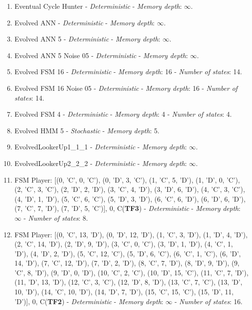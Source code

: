 \documentclass[10pt,letterpaper]{article}
\begin{document}
\begin{enumerate}
\item Eventual Cycle Hunter - \textit{Deterministic} - \textit{Memory depth}: \(\infty\). \cite{axelrodproject}
\item Evolved ANN - \textit{Deterministic} - \textit{Memory depth}: \(\infty\). \cite{axelrodproject}
\item Evolved ANN 5 - \textit{Deterministic} - \textit{Memory depth}: \(\infty\). \cite{axelrodproject}
\item Evolved ANN 5 Noise 05 - \textit{Deterministic} - \textit{Memory depth}: \(\infty\). \cite{axelrodproject}
\item Evolved FSM 16 - \textit{Deterministic} - \textit{Memory depth}: 16 - \textit{Number of states}: 14. \cite{axelrodproject}
\item Evolved FSM 16 Noise 05 - \textit{Deterministic} - \textit{Memory depth}: 16 - \textit{Number of states}: 14. \cite{axelrodproject}
\item Evolved FSM 4 - \textit{Deterministic} - \textit{Memory depth}: 4 - \textit{Number of states}: 4. \cite{axelrodproject}
\item Evolved HMM 5 - \textit{Stochastic} - \textit{Memory depth}: 5. \cite{axelrodproject}
\item EvolvedLookerUp1\_1\_1 - \textit{Deterministic} - \textit{Memory depth}: \(\infty\). \cite{axelrodproject}
\item EvolvedLookerUp2\_2\_2 - \textit{Deterministic} - \textit{Memory depth}: \(\infty\). \cite{axelrodproject}
\item FSM Player: [(0, 'C', 0, 'C'), (0, 'D', 3, 'C'), (1, 'C', 5, 'D'), (1, 'D', 0, 'C'), (2, 'C', 3, 'C'), (2, 'D', 2, 'D'), (3, 'C', 4, 'D'), (3, 'D', 6, 'D'), (4, 'C', 3, 'C'), (4, 'D', 1, 'D'), (5, 'C', 6, 'C'), (5, 'D', 3, 'D'), (6, 'C', 6, 'D'), (6, 'D', 6, 'D'), (7, 'C', 7, 'D'), (7, 'D', 5, 'C')], 0, C(\textbf{TF3}) - \textit{Deterministic} - \textit{Memory depth}: \(\infty\) - \textit{Number of states}: 8.
\item FSM Player: [(0, 'C', 13, 'D'), (0, 'D', 12, 'D'), (1, 'C', 3, 'D'), (1, 'D', 4, 'D'), (2, 'C', 14, 'D'), (2, 'D', 9, 'D'), (3, 'C', 0, 'C'), (3, 'D', 1, 'D'), (4, 'C', 1, 'D'), (4, 'D', 2, 'D'), (5, 'C', 12, 'C'), (5, 'D', 6, 'C'), (6, 'C', 1, 'C'), (6, 'D', 14, 'D'), (7, 'C', 12, 'D'), (7, 'D', 2, 'D'), (8, 'C', 7, 'D'), (8, 'D', 9, 'D'), (9, 'C', 8, 'D'), (9, 'D', 0, 'D'), (10, 'C', 2, 'C'), (10, 'D', 15, 'C'), (11, 'C', 7, 'D'), (11, 'D', 13, 'D'), (12, 'C', 3, 'C'), (12, 'D', 8, 'D'), (13, 'C', 7, 'C'), (13, 'D', 10, 'D'), (14, 'C', 10, 'D'), (14, 'D', 7, 'D'), (15, 'C', 15, 'C'), (15, 'D', 11, 'D')], 0, C(\textbf{TF2}) - \textit{Deterministic} - \textit{Memory depth}: \(\infty\) - \textit{Number of states}: 16.

\end{enumerate}
\end{document}

